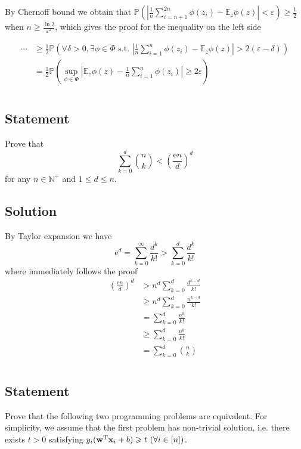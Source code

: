 \documentclass[8pt]{article}
\theoremstyle{compact}
\def\le{\leqslant}
\def\ge{\geqslant}
\def\P#1{\mathbb{P}\left({#1}\right)}
\def\e{\mathrm{e}}
\begin{document}
By Chernoff bound we obtain that $\P{\left|\frac1n\sum\limits_{i=n+1}^{2n}\phi(z_i) - \mathbb E_z\phi(z)\right| < \varepsilon} \ge \frac12$ when $n \ge \frac{\ln 2}{\varepsilon^2}$, which gives the proof for the inequality on the left side

\begin{equation}
	\begin{split}
		\cdots &\ge \frac12 \P{\forall \delta > 0, \exists \phi \in \Phi \text{ s.t. } \left|\frac1n\sum_{i=1}^{n}\phi(z_i) - \mathbb E_z\phi(z)\right| > 2(\varepsilon - \delta) }\\
		&= \frac12 \P{\sup_{\phi \in \Phi}\left|\mathbb E_z{\phi(z)} - \frac1n\sum_{i=1}^{n}\phi(z_i)\right| \ge 2\varepsilon} 
	\end{split}
\end{equation}


\section{}
\subsection*{Statement}
Prove that $$\sum_{k=0}^d\binom{n}{k} < \left(\frac{\e n}{d}\right)^d$$ for any $n \in \mathbb N^+$ and $1 \le d \le n$.
\subsection*{Solution}
By Taylor expansion we have $$\e^d = \sum_{k = 0}^{\infty}\frac{d^k}{k!} > \sum_{k=0}^d\frac{d^k}{k!}$$ where immediately follows the proof 
\begin{equation}
	\begin{split}
		\left(\frac{\e n}{d}\right)^d &> n^d\sum_{k=0}^{d}\frac{d^{k-d}}{k!}\\
		&\ge n^d\sum_{k=0}^{d}\frac{n^{k-d}}{k!}\\
		&= \sum_{k=0}^{d}\frac{n^k}{k!}\\
		&\ge \sum_{k=0}^{d}\frac{n^{\underline k}}{k!}\\
		&= \sum_{k=0}^d\binom nk
	\end{split}
\end{equation}

\section{}
\subsection*{Statement}
Prove that the following two programming problems are equivalent. For simplicity, we assume that the first problem has non-trivial solution, i.e. there exists $t > 0$ satisfying $y_i(\mathbf w^{\text T}\mathbf x_i + b) \ge t \ (\forall i \in [n])$.\\
\end{document}
